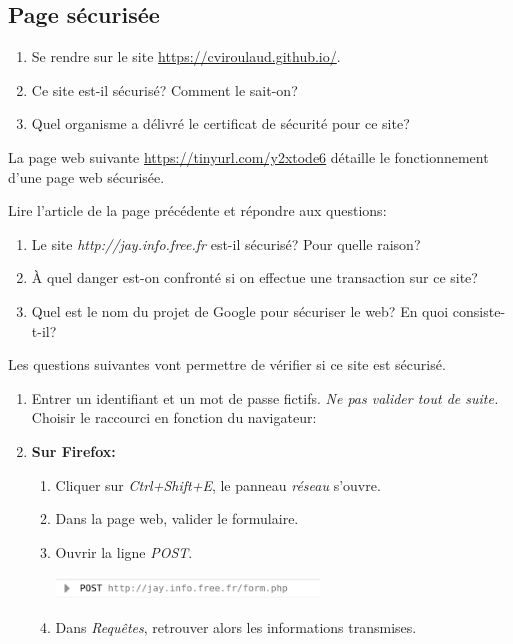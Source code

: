 \documentclass[a4paper,11pt]{article}
\begin{document}
\begin{Form}
\subsection{Page sécurisée}
\begin{activite}
\begin{enumerate}
\item Se rendre sur le site \mbox{\url{https://cviroulaud.github.io/}}.
\item Ce site est-il sécurisé? Comment le sait-on?
\item Quel organisme a délivré le certificat de sécurité pour ce site? 
\end{enumerate}
\end{activite}
\noindent La page web suivante \mbox{\url{https://tinyurl.com/y2xtode6}} détaille le fonctionnement d'une page web sécurisée.
\begin{activite}
Lire l'article de la page précédente et répondre aux questions:
\begin{enumerate}
\item Le site \emph{http://jay.info.free.fr} est-il sécurisé? Pour quelle raison?
\item À quel danger est-on confronté si on effectue une transaction sur ce site? 
\item Quel est le nom du projet de Google pour sécuriser le web? En quoi consiste-t-il?
\end{enumerate}
Les questions suivantes vont permettre de vérifier si ce site est sécurisé.
\begin{enumerate}[resume]
\item Entrer un identifiant et un mot de passe fictifs. \emph{Ne pas valider tout de suite.}
\\Choisir le raccourci en fonction du navigateur:
\item \textbf{Sur Firefox:}
\begin{enumerate}
\item  Cliquer sur \emph{Ctrl+Shift+E}, le panneau \emph{réseau} s'ouvre.
\item Dans la page web, valider le formulaire.
\item Ouvrir la ligne \emph{POST}.
\begin{center}
\includegraphics[width=7cm]{ressources/post-ff.png}
\end{center}
\item Dans \emph{Requêtes}, retrouver alors les informations transmises.

\end{enumerate}
\end{enumerate}
\end{activite}
\end{Form}
\end{document}
